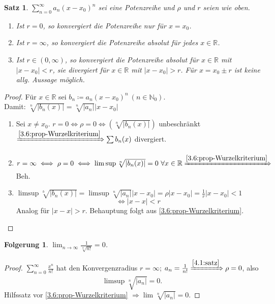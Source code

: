 \documentclass[12pt]{extreport} %
\newcommand{\N}{\mathbb{N}}
\newcommand{\R}{\mathbb{R}}
\theoremstyle{named}
\theoremstyle{dotless}
\newtheorem{satz}[unnamedtheorem]{Satz}
\newtheorem*{folgerung*}{Folgerung}
\begin{document}
\begin{satz} \label{4.1:satz}
	$\sum_{n=0}^{\infty} a_{n} (x - x_{0})^{n}$ sei eine Potenzreihe und $\rho$ und $r$ seien wie oben.
	\begin{enumerate}
		\item Ist $r = 0$, so konvergiert die Potenzreihe nur für $x = x_{0}$.
		\item Ist $r = \infty$, so konvergiert die Potenzreihe absolut für jedes $x \in \R$.
		\item Ist $r \in (0, \infty)$, so konvergiert die Potenzreihe absolut für $x \in \R$ mit $|x - x_{0}| < r$, sie divergiert für $x \in \R$ mit $|x - x_{0}| > r$. Für $x = x_{0} \pm r$ ist keine allg. Aussage möglich.
			
	\end{enumerate}
\end{satz}

\begin{proof}
	Für $x \in \R$ sei $b_{n} \coloneqq a_{n} (x - x_{0})^{n} ~(n \in \N_{0})$. \\
	Damit: $\sqrt[n]{|b_{n}(x)|} = \sqrt[n]{|a_{n}|} |x - x_{0}|$
	\begin{enumerate}
		\item Sei $x \neq x_{0}$. $r = 0 \iff \rho = 0 \iff \left( \sqrt[n]{|b_{n}(x)|} \right)$ unbeschränkt $\xRightarrow[]{\ref{3.6:prop-Wurzelkriterium}} \sum b_{n}(x)$ divergiert.
		\item $r = \infty \iff \rho = 0 \iff \limsup \sqrt[n]{|b_{n}(x)|} = 0 ~\forall x \in \R \xRightarrow[]{\ref{3.6:prop-Wurzelkriterium}}$ Beh.
		\item $\limsup \sqrt[b]{|b_{n}(x)|} = \limsup \sqrt[n]{|a_{n}|} |x - x_{0}| = \rho |x - x_{0}| = \frac{1}{r} |x - x_{0}| < 1$ 
			$$ \iff |x - x| < r $$
			Analog für $|x - x| > r$. Behauptung folgt aus \ref{3.6:prop-Wurzelkriterium}.
	\end{enumerate}	
\end{proof}


\begin{folgerung*}
	$\lim_{n \rightarrow \infty} \frac{1}{\sqrt[n]{n!}} = 0$.	
\end{folgerung*}

\begin{proof}
	$\sum_{n=0}^{\infty} \frac{x^{n}}{n!}$ hat den Konvergenzradius $r = \infty$; $a_{n} = \frac{1}{n!} \xRightarrow[]{\ref{4.1:satz}} \rho = 0$, also 
	$$ \limsup \sqrt[n]{|a_{n}|} = 0. $$
	Hilfssatz vor \ref{3.6:prop-Wurzelkriterium} $\Rightarrow \lim \sqrt[n]{|a_{n}|} = 0$.
\end{proof}
\end{document}
